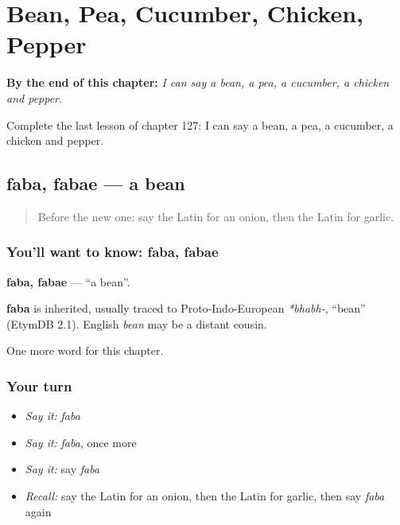 
\chapter{Bean, Pea, Cucumber, Chicken, Pepper}
\label{ch:la-bean-pea-cucumber-chicken-pepper}

\begin{chapteropening}
\textbf{By the end of this chapter:} \emph{I can say a bean, a pea, a cucumber, a chicken and pepper.}

Complete the last lesson of chapter 127: I can say a bean, a pea, a cucumber, a chicken and pepper.
\end{chapteropening}

\section[faba, fabae]{faba, fabae — a bean}

\label{lesson:LA-C127-faba}



\begin{quote}
Before the new one: say the Latin for an onion, then the Latin for garlic.
\end{quote}

\subsection*{You'll want to know: faba, fabae}
\textbf{faba, fabae} — \textquotedblleft{}a bean\textquotedblright{}.

\begin{cousinweb}
\textbf{faba} is inherited, usually traced to Proto-Indo-European \emph{*bhabh-}, \textquotedblleft{}bean\textquotedblright{} (EtymDB 2.1). English \emph{bean} may be a distant cousin.
\end{cousinweb}

\begin{grammarlens}[title={What you've built}]
One more word for this chapter.
\end{grammarlens}

\subsection*{Your turn}
\begin{itemize}
\raggedright
  \item \emph{Say it:} \emph{faba}
  \item \emph{Say it:} \emph{faba}, once more
  \item \emph{Say it:} say \emph{faba}
  \item \emph{Recall:} say the Latin for an onion, then the Latin for garlic, then say \emph{faba} again
\end{itemize}

